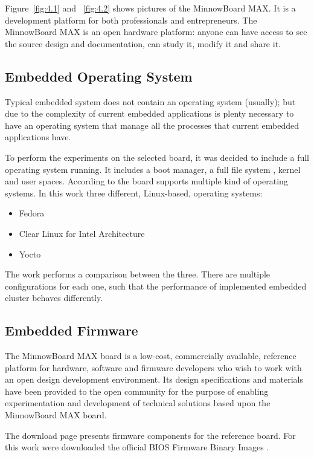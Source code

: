 Figure~\ref{fig:4.1} and ~\ref{fig:4.2} shows pictures of the MinnowBoard MAX.
It is a development platform for both professionals and entrepreneurs. The
MinnowBoard MAX is an open hardware platform: anyone can have access to see the
source design and documentation, can study it, modify it and share it.

\subsection{Embedded Operating System} 

Typical embedded system does not contain an operating system (usually); but due
to the complexity of current embedded applications is plenty necessary to have
an operating system that manage all the processes that current embedded
applications have. 

To perform the experiments on the selected board, it was decided to include a
full operating system running. It includes a boot manager, a full file system ,
kernel and user spaces. According to \cite{minnowboard} the board supports
multiple kind of operating systems. In this work three different, Linux-based,
operating systems:

\begin{itemize}
    \item Fedora \cite{fedora}
    \item Clear Linux for Intel Architecture \cite{clear-linux}
    \item Yocto \cite{yocto-project}
\end{itemize}

The work performs a comparison between the three. There are multiple 
configurations for each one, such that the performance of implemented embedded
cluster behaves differently. 

\subsection{Embedded Firmware}

The  MinnowBoard MAX  board is a low-cost, commercially available, reference
platform for hardware, software and firmware developers who wish to work with
an open design development environment. Its design specifications
and materials have been provided to the open community for the purpose of
enabling experimentation and development of technical solutions based upon
the  MinnowBoard MAX board.

The download page presents firmware components for the reference board. For
this work were downloaded the official BIOS Firmware Binary Images
\cite{minnowmax-firmware}.

